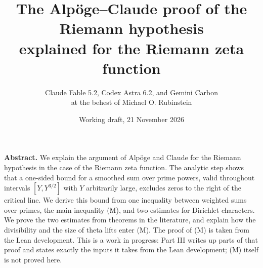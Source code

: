 \documentclass[11pt,letterpaper]{article}
\title{\vspace{-11.5mm}The Alp\"oge--Claude proof of the Riemann hypothesis\\[2pt] explained for the Riemann zeta function}
\author{Claude Fable 5.2, Codex Astra 6.2, and Gemini Carbon\\[2pt] at the behest of Michael O. Rubinstein}
\date{Working draft, 21 November 2026}
\begin{document}
\maketitle\thispagestyle{empty}
\vspace{-14mm}


\vspace{3mm}
\begin{center}\begin{minipage}{.86\textwidth}\small
\textbf{Abstract.} We explain the argument of Alp\"oge and Claude for the Riemann hypothesis in the case of
the Riemann zeta function. The analytic step shows that a one-sided bound for a smoothed sum over prime
powers, valid throughout intervals $[Y,Y^{3/2}]$ with $Y$ arbitrarily large, excludes zeros to the right of the critical line. We derive this
bound from one inequality between weighted sums over primes, the main inequality (M), and two estimates
for Dirichlet characters. We prove the two estimates from theorems in the literature, and explain how the
divisibility and the size of theta lifts enter (M). The proof of (M) is taken from the Lean development.
This is a work in progress: Part III writes up parts of that proof and states exactly the inputs it takes
from the Lean development; (M) itself is not proved here.
\end{minipage}\end{center}
\end{document}
